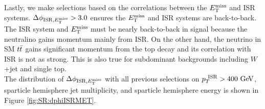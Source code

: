 
\indent Lastly, we make selections based on the correlations between the $E_{\mathrm{T}}^{\mathrm{miss}}$ and ISR systems.  $\Delta\phi_{\mathrm{ISR},E_{\mathrm{T}}^{\mathrm{miss}}} > 3.0$ ensures the $E_{\mathrm{T}}^{\mathrm{miss}}$ and ISR systems are back-to-back.  The ISR system and $E_{\mathrm{T}}^{\mathrm{miss}}$ must be nearly back-to-back in signal because the neutralino gains momentum mainly from ISR.  On the other hand, the neutrino in SM $t\bar{t}$ gains significant momentum from the top decay and its correlation with ISR is not as strong. This is also true for subdominant backgrounds including $W$+jet and single top. \\

\indent The distribution of $\Delta\phi_{\mathrm{ISR},E_{\mathrm{T}}^{\mathrm{miss}}}$ with all previous selections on $\PTISR > 400 \gev$, sparticle hemisphere jet multiplicity, and sparticle hemisphere energy is shown in Figure \ref{fig:SR:dphiISRMET}. \\  %

